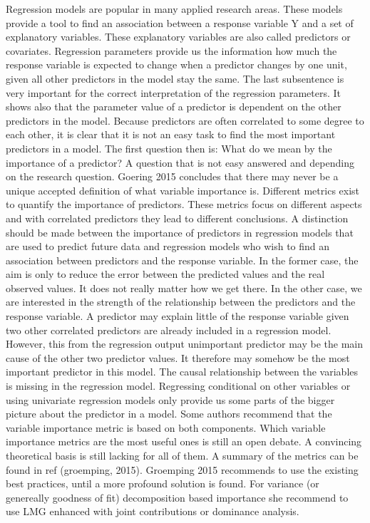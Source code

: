\documentclass[11pt,a4paper,twoside]{book}\usepackage[]{graphicx}\usepackage[]{color}
\begin{document}
Regression models are popular in many applied research areas. These models provide a tool to find an association between a response variable Y and a set of explanatory variables. These explanatory variables are also called predictors or covariates. Regression parameters provide us the information how much the response variable is expected to change when a predictor changes by one unit, given all other predictors in the model stay the same. The last subsentence is very important for the correct interpretation of the regression parameters. It shows also that the parameter value of a predictor is dependent on the other predictors in the model. Because predictors are often correlated to some degree to each other, it is clear that it is not an easy task to find the most important predictors in a model. The first question then is: What do we  mean by the importance of a predictor? A question that is not easy answered and depending on the research question. Goering 2015 concludes that there may never  be a unique accepted definition of what variable importance is.   Different metrics exist to quantify the importance of predictors. These metrics focus on different aspects and with correlated predictors they  lead to different conclusions. A distinction should be made between the importance of predictors in regression models that are used to predict future data and regression models who wish to find an association between predictors and the response variable. In the former case, the aim is only to reduce the error between the predicted values and the real observed values. It does not really matter how we get there. In the other case, we are interested in the strength of the relationship between the predictors and the response variable. A predictor may explain little of the response variable given two other correlated predictors are already included in a regression model. However, this from the regression output unimportant predictor may be the main cause of the other two predictor values.  It therefore may somehow be the most important predictor in this model. The causal relationship between the variables is missing in the regression model. Regressing conditional on  other variables or using univariate regression models only provide us some parts of the bigger picture about the predictor in a model. Some authors recommend that the variable importance metric is based on both components. Which variable importance metrics are the most useful ones is still an open debate. A convincing theoretical basis is still lacking for all of them. A summary of the metrics can be found in ref (groemping, 2015). Groemping 2015 recommends to use the existing best practices, until a more profound solution is found. For variance (or genereally goodness of fit) decomposition based importance she recommend to use LMG enhanced with joint contributions or dominance analysis.  
\end{document}
